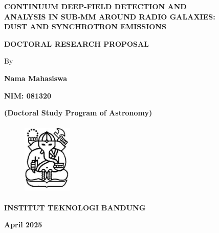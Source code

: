 \pagestyle{empty}
\begin{titlepage}
\begin{center}
\mbox{}
\vspace{1cm}

\textbf{CONTINUUM DEEP-FIELD DETECTION AND \\ ANALYSIS IN SUB-MM AROUND RADIO GALAXIES: \\ DUST AND SYNCHROTRON EMISSIONS}

\vspace{3cm}

\textbf{DOCTORAL RESEARCH PROPOSAL}\\

\vspace{3cm}

\normalsize{By}

\textbf{Nama Mahasiswa}

\textbf{NIM: 081320}

\textbf{(Doctoral Study Program of Astronomy)}

\vspace{2.0cm}

\begin{figure}[!h]
\centering
\includegraphics[width=2.35cm, height=3.5cm]{fig/logo_itb.png}
\end{figure}

\vspace{2.0cm}

\textbf{INSTITUT TEKNOLOGI BANDUNG}

\textbf{April 2025}

\end{center}
\end{titlepage}

\cleardoublepage
